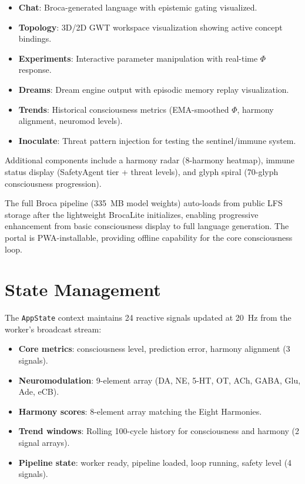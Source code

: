 \documentclass[12pt]{book}
\begin{document}
\begin{itemize}
  \item \textbf{Chat}: Broca-generated language with epistemic gating visualized.
  \item \textbf{Topology}: 3D/2D GWT workspace visualization showing active concept bindings.
  \item \textbf{Experiments}: Interactive parameter manipulation with real-time $\Phi$ response.
  \item \textbf{Dreams}: Dream engine output with episodic memory replay visualization.
  \item \textbf{Trends}: Historical consciousness metrics (EMA-smoothed $\Phi$, harmony alignment, neuromod levels).
  \item \textbf{Inoculate}: Threat pattern injection for testing the sentinel/immune system.
\end{itemize}

Additional components include a harmony radar (8-harmony heatmap), immune status display (SafetyAgent tier + threat levels), and glyph spiral (70-glyph consciousness progression).

The full Broca pipeline (335~MB model weights) auto-loads from public LFS storage after the lightweight BrocaLite initializes, enabling progressive enhancement from basic consciousness display to full language generation. The portal is PWA-installable, providing offline capability for the core consciousness loop.

\section{State Management}

The \texttt{AppState} context maintains 24 reactive signals updated at 20~Hz from the worker's broadcast stream:

\begin{itemize}
  \item \textbf{Core metrics}: consciousness level, prediction error, harmony alignment (3 signals).
  \item \textbf{Neuromodulation}: 9-element array (DA, NE, 5-HT, OT, ACh, GABA, Glu, Ade, eCB).
  \item \textbf{Harmony scores}: 8-element array matching the Eight Harmonies.
  \item \textbf{Trend windows}: Rolling 100-cycle history for consciousness and harmony (2 signal arrays).
  \item \textbf{Pipeline state}: worker ready, pipeline loaded, loop running, safety level (4 signals).
\end{itemize}
\end{document}

